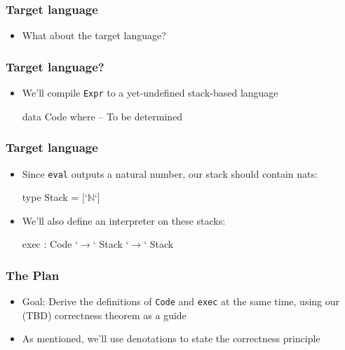 \documentclass[usenames,dvipsnames]{beamer}
\newcommand{\N}{\mathbb{N}}
\begin{document}

\begin{frame}
  \frametitle{Target language}

  \begin{itemize}
    \item What about the target language?
  \end{itemize}
\end{frame}

\newcommand{\Expr}{\texttt{Expr}}

\begin{frame}[fragile]
  \frametitle{Target language?}

  \begin{itemize}
    \item We'll compile \Expr{} to a yet-undefined stack-based language

      \begin{code}
        data Code where
          -- To be determined
      \end{code}
  \end{itemize}
\end{frame}


\begin{frame}[fragile]
  \frametitle{Target language}

  \begin{itemize}
    \item Since \texttt{eval} outputs a natural number, our stack should
      contain nats:

      \begin{code}
        type Stack = [`$\N$`]
      \end{code}

    \item We'll also define an interpreter on these stacks:

      \begin{code}
        exec : Code `$\rightarrow$` Stack `$\rightarrow$` Stack
      \end{code}
  \end{itemize}
\end{frame}


\begin{frame}[fragile]
  \frametitle{The Plan}

  \begin{itemize}
    \item Goal: Derive the definitions of \texttt{Code} and \texttt{exec}
      at the same time, using our (TBD) correctness theorem as a guide
    \item As mentioned, we'll use denotations to state the correctness
      principle
  \end{itemize}
\end{frame}
\end{document}
